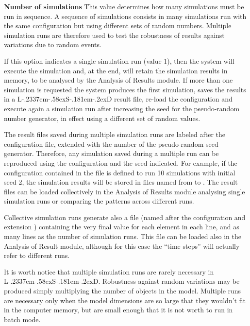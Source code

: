 \documentclass [11pt,a4paper] {book}
\def\LsD{{L\kern-.2337em\lower-.58ex\hbox{S}\kern-.181em\lower-.2ex\hbox{D}}\xspace}
\begin{document}
\bigskip

\textbf{Number of simulations}
This value determines how many simulations must be run in sequence. A sequence of simulations consists in many simulations run with the same configuration but using different sets of random numbers. Multiple simulation runs are therefore used to test the robustness of results against variations due to random events.


If this option indicates a single simulation run (value 1), then the system will execute the simulation and, at the end, will retain the simulation results in memory, to be analysed by the Analysis of Results module. If more than one simulation is requested the system produces the first simulation, saves the results in a \LsD result file, re-load the configuration and execute again a simulation run after increasing the seed for the pseudo-random number generator, in effect using a different set of random values.

The result files saved during multiple simulation runs are labeled after the configuration file, extended with the number of the pseudo-random seed generator. Therefore, any simulation  saved during a multiple run can be reproduced using the configuration and the seed indicated. For example, if the configuration contained in the file  is defined to run 10 simulations with initial seed 2, the simulation results will be stored in files named from  to . The result files can be loaded collectively in the Analysis of Results module analysing single simulation runs or comparing the patterns across different runs.

Collective simulation runs generate also a file (named after the configuration and extension ) containing the very final value for each element in each line, and as many lines as the number of simulation runs. This file can be loaded also in the Analysis of Result module, although for this case the ``time steps'' will actually refer to different runs.

It is worth notice that multiple simulation runs are rarely necessary in \LsD. Robustness against random variations may be produced simply multiplying the number of objects in the model. Multiple runs are necessary only when the model dimensions are so large that they wouldn't fit in the computer memory, but are small enough that it is not worth to run in batch mode.

\bigskip
\end{document}
